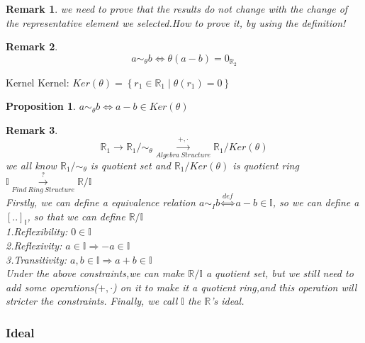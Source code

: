 \documentclass[13pt, a4paper, oneside]{book}
\newtheorem{pro}[theorem]{Proposition}
\newtheorem{remark}{Remark}[section]
\begin{document}
	\begin{remark}
		we need to prove that the results do not change with the change of the representative element we selected.How to prove it, by using the definition!
	\end{remark}
	
	\begin{remark}
		$$ a \sim_{\theta} b \Longleftrightarrow \theta ( a-b ) = 0_{\mathbb{R}_2} $$
	\end{remark}
	
	\begin{definition}{Kernel}{}
		Kernel: $ Ker(\theta) = \left\{ r_1 \in \mathbb{R}_1 \mid \theta (r_1) = 0 \right\}$
	\end{definition}
	
	\begin{pro}
		$ a \sim_{\theta} b \Longleftrightarrow a-b \in Ker(\theta) $
	\end{pro}
	
	\begin{remark}
		$$ \mathbb{R}_1 \longrightarrow \mathbb{R}_1 / \sim_{\theta} \overset{+,\cdot}{\underset{Algebra~Structure}{\longrightarrow}} \mathbb{R}_1/ Ker(\theta) $$
		we all know $ \mathbb{R}_1/ \sim_{\theta} $ is 	quotient set and $ \mathbb{R}_1 / Ker(\theta) $ is quotient ring \\
		$ \mathbb{I} \overset{?}{\underset{Find~Ring~Structure}{\longrightarrow}} \mathbb{R}/ \mathbb{I}  $ \\
		Firstly, we can define a equivalence relation $ a \sim_{I} b \overset{def}{\Longleftrightarrow} a-b \in \mathbb{I} $, so we can define a $ \left[..\right]_{\mathbb{I}} $, so that we can define $ \mathbb{R}/ \mathbb{I} $\\
		1.Reflexibility: $0 \in \mathbb{I}$ \\
		2.Reflexivity: $ a \in \mathbb{I} \Longrightarrow -a \in \mathbb{I} $ \\
		3.Transitivity: $ a,b \in \mathbb{I} \Longrightarrow a+b \in \mathbb{I} $ \\
		Under the above constraints,we can make $ \mathbb{R}/ \mathbb{I} $ a quotient set, but we still need to add some operations($ +, \cdot $) on it to make it a quotient ring,and this operation will stricter the constraints. Finally, we call $\mathbb{I}$ the $\mathbb{R}$'s ideal.
	\end{remark}
	
	\subsubsection{Ideal}
	
\end{document}
